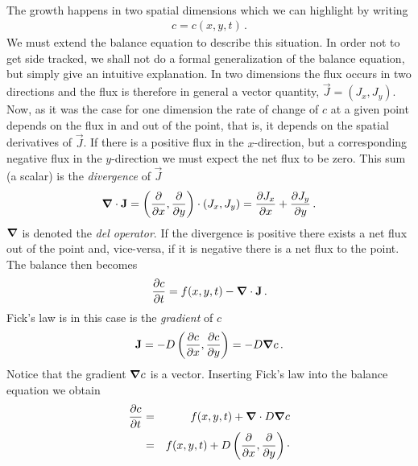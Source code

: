 \begin{example}
	\paragraph{}
	\vspace*{-\parskip}
	The growth happens in two spatial dimensions which we can highlight by
	writing  
	\begin{eqnarray}
		c = c(x,y,t) \, .
	\end{eqnarray}
	We must extend the balance equation to describe this situation. 
	In order not to get side tracked, we shall not
	do a formal generalization of the balance equation, but simply give an
	intuitive explanation. In two dimensions the flux occurs in two directions
	and the flux is therefore in general a vector quantity, $\vec{J}=(J_x, J_y)$. 
	Now, as it was the case for one dimension the rate of change of $c$ at a 
	given point depends on the flux in and out of the point, that is,
	it depends on the spatial derivatives of $\vec{J}$. If there is a positive 
	flux in the $x$-direction, but a corresponding negative flux in the
	$y$-direction we must expect the net flux to be zero. This sum (a scalar) 
	is the	\emph{divergence} of $\vec{J}$
	\begin{equation}
		\boldsymbol{\nabla} \cdot \mathbf{J} = 
		\left( \frac{\partial}{\partial x}, \frac{\partial}{\partial y}\right)
		\cdot (J_x, J_y) = 
		\frac{\partial J_x}{\partial x} + \frac{\partial J_y}{\partial y} \, .
	\end{equation}
	$\boldsymbol{\nabla}$ is denoted the \emph{del operator}. If the divergence is
	positive there exists a net flux out of the point and, vice-versa, if it is 
	negative there is a net flux to the point.  The balance then becomes
	\begin{equation}
		\frac{\partial c}{\partial t} = f(x,y,t) - \boldsymbol{\nabla} \cdot \mathbf{J} \, . 
	\end{equation}
	Fick's law is in this case is the \emph{gradient} of $c$
	\begin{equation}
		\mathbf{J} = -D \left(\frac{\partial c}{\partial x}, \frac{\partial
		c}{\partial y}\right) = -D \boldsymbol{\nabla} c \, .
	\end{equation}
	Notice that the gradient $\boldsymbol{\nabla} c$ is a vector. Inserting Fick's
	law into the balance equation we obtain
	\begin{eqnarray}
		\frac{\partial c}{\partial t} &=& f(x,y,t) + \vecs{\nabla} \cdot D
		\vecs{\nabla} c \nonumber \\
		&=&  f(x,y,t) + D \left( \frac{\partial}{\partial x},
		\frac{\partial}{\partial y}\right) \cdot 

\end{eqnarray}
\end{example}
